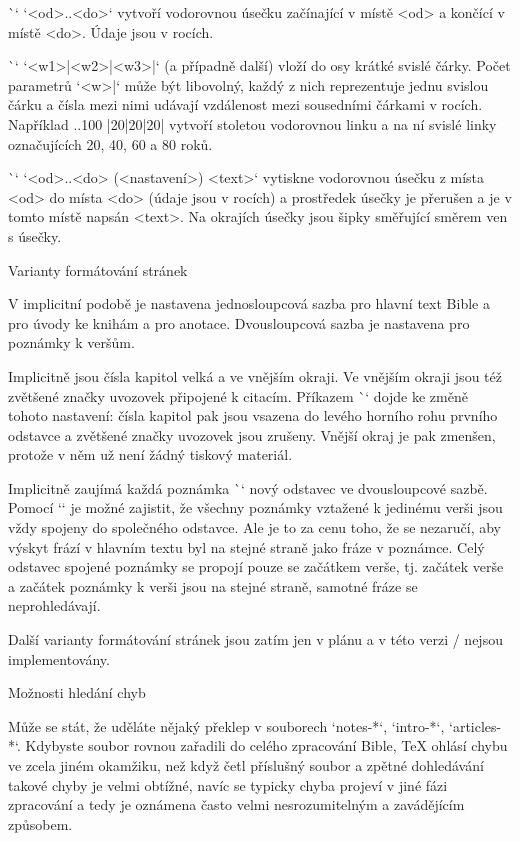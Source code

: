 \`\tline` `<od>..<do>` vytvoří vodorovnou úsečku začínající v místě <od> a
končící v místě <do>. Údaje jsou v rocích.

\`\tlines` `<w1>|<w2>|<w3>|` (a případně další) vloží do osy krátké svislé čárky.
Počet parametrů `<w>|` může být libovolný, každý z nich reprezentuje jednu
svislou čárku a čísla mezi nimi udávají vzdálenost mezi sousedními čárkami v
rocích. Například
\begtt
{}..100
|20|20|20|
\endtt
vytvoří stoletou vodorovnou linku a na ní svislé linky označujících 20,
40, 60 a 80 roků.

\`\arrowtext` `<od>..<do> (<nastavení>) {<text>}`
vytiskne vodorovnou úsečku z místa <od> do místa <do> (údaje jsou v rocích)
a prostředek úsečky je přerušen a je v tomto místě napsán <text>. Na
okrajích úsečky jsou šipky směřující směrem ven s úsečky.


\sec Varianty formátování stránek

V implicitní podobě je nastavena jednosloupcová sazba pro hlavní text Bible
a pro úvody ke knihám a pro anotace. Dvousloupcová sazba je nastavena pro
poznámky k veršům.

Implicitně jsou čísla kapitol velká a ve vnějším okraji. Ve vnějším okraji jsou též
zvětšené značky uvozovek připojené k citacím. Příkazem \`\normalchapnumbers`
dojde ke změně tohoto nastavení: čísla kapitol pak jsou vsazena do levého
horního rohu prvního odstavce a zvětšené značky uvozovek jsou zrušeny.
Vnější okraj je pak zmenšen, protože v něm už není žádný tiskový materiál.  

Implicitně zaujímá každá poznámka \`\Note` nový odstavec ve dvousloupcové
sazbě. Pomocí `\mergednotes` je možné zajistit, že všechny poznámky vztažené
k jedinému verši jsou vždy spojeny do společného odstavce. Ale je to za cenu
toho, že se nezaručí, aby výskyt frází v hlavním textu byl na stejné straně
jako fráze v poznámce. Celý odstavec spojené poznámky se propojí pouze se
začátkem verše, tj. začátek verše a začátek poznámky k verši jsou na stejné
straně, samotné fráze se neprohledávají.

Další varianty formátování stránek jsou zatím jen v plánu a v této verzi \OpBible/ nejsou
implementovány.


\sec Možnosti hledání chyb

Může se stát, že uděláte nějaký překlep v souborech `notes-*`, `intro-*`,
`articles-*`. Kdybyste soubor rovnou zařadili do celého zpracování Bible,
TeX ohlásí chybu ve zcela jiném okamžiku, než když četl příslušný soubor a
zpětné dohledávání takové chyby je velmi obtížné, navíc se typicky chyba
projeví v jiné fázi zpracování a tedy je oznámena často velmi
nesrozumitelným a zavádějícím způsobem.

